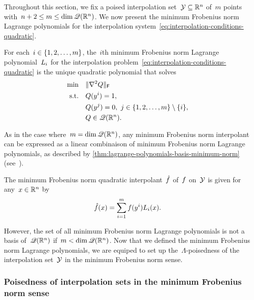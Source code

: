 Throughout this section, we fix a poised interpolation set~$\xpt \subseteq \R^n$ of~$m$ points with~$n + 2 \le m \le \dim \mathscr{Q}(\mathbb{R}^n)$.
We now present the minimum Frobenius norm Lagrange polynomials for the interpolation system~\cref{eq:interpolation-conditions-quadratic}.

\begin{definition}
    \label{def:lagrange-polynomials-minimum-norm}
    For each~$i \in \{1, 2, \dots, m\}$, the~$i$th minimum Frobenius norm Lagrange polynomial~$\lagp[i]$ for the interpolation problem~\cref{eq:interpolation-conditions-quadratic} is the unique quadratic polynomial that solves
    \begin{align*}
        \min        & \quad \lVert\nabla^2 Q\rVert_{\mathsf{F}}\\
        \text{s.t.} & \quad Q(y^i) = 1,\\
                    & \quad Q(y^j) = 0, ~ j \in \{1, 2, \dots, m\} \setminus \{i\},\\
                    & \quad Q \in \mathscr{Q}(\mathbb{R}^n).
    \end{align*}
\end{definition}

As in the case where~$m = \dim \mathscr{Q}(\mathbb{R}^n)$, any minimum Frobenius norm interpolant can be expressed as a linear combinaison of minimum Frobenius norm Lagrange polynomials, as described by \cref{thm:lagrange-polynomials-basis-minimum-norm} (see~\cite[\S~3]{Powell_2004b}).

\begin{theorem}
    \label{thm:lagrange-polynomials-basis-minimum-norm}
    The minimum Frobenius norm quadratic interpolant~$\objm$ of~$f$ on~$\xpt$ is given for any~$x \in \mathbb{R}^n$ by
    \begin{equation*}
        \objm(x) = \sum_{i = 1}^m \obj(y^i) \lagp[i](x).
    \end{equation*}
\end{theorem}

However, the set of all minimum Frobenius norm Lagrange polynomials is not a basis of~$\mathscr{Q}(\mathbb{R}^n)$ if~$m < \dim \mathscr{Q}(\mathbb{R}^n)$.
Now that we defined the minimum Frobenius norm Lagrange polynomials, we are equiped to set up the~$\Lambda$-poisedness of the interpolation set~$\xpt$ in the minimum Frobenius norm sense.

\subsubsection{Poisedness of interpolation sets in the minimum Frobenius norm sense}

